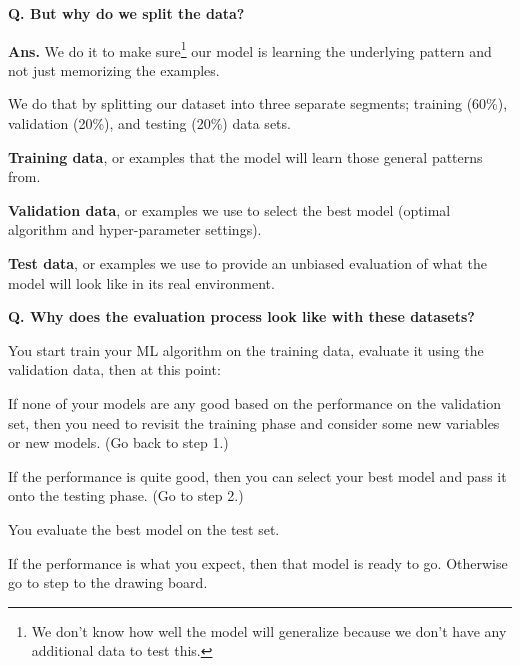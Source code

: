\begin{frame}[fragile]{\textbf{Q. But why do we split the data?}}
  \begin{wideitemize}
    \item \textbf{Ans.} We do it to make sure\footnote{We don't know how well the model will generalize
    because we don't have any additional data to test this.} our model is learning
    the underlying pattern and not just memorizing the examples.
    \item We do that by splitting our dataset into three separate segments;
    training (60\%), validation (20\%), and testing (20\%) data sets.\medskip
    \begin{wideitemize}
      \item \textbf{Training data}, or examples that the model will learn
      those general patterns from.
      \item \textbf{Validation data}, or examples we use to select the best model (optimal algorithm
      and hyper-parameter settings).
      \item \textbf{Test data}, or examples we use to provide an unbiased evaluation of what
      the model will look like in its real environment.
    \end{wideitemize}
  \end{wideitemize}
\end{frame}


\begin{frame}[fragile]{\textbf{Q. Why does the evaluation process look like with these datasets?}}
  \begin{wideitemize}
    \item[1.] You start train your ML algorithm on the training data, evaluate it
    using the validation data, then at this point:\medskip
    \begin{wideitemize}
      \item If none of your models are any good based on the performance on the
      validation set, then you need to revisit the training phase and consider
      some new variables or new models. (Go back to step 1.)
      \item If the performance is quite good, then you can select your best model
      and pass it onto the testing phase. (Go to step 2.)
    \end{wideitemize}
    \item[2.] You evaluate the best model on the test set.\medskip
    \begin{wideitemize}
      \item If the performance is what you expect, then that model is ready to go.
      Otherwise go to step to the drawing board.
    \end{wideitemize}
  \end{wideitemize}
\end{frame}

